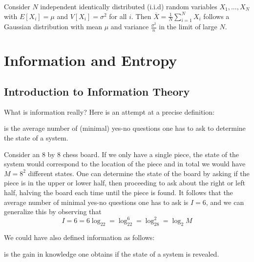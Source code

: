 \documentclass[12pt, a4paper, oneside, openright, titlepage]{book}
\begin{document}
\begin{namthm}
    Consider $N$ independent identically distributed (i.i.d) random variables $X_1,...,X_N$ with $E[X_i] = \mu$ and $V[X_i] = \sigma^2$ for all $i$. Then $\overline{X} = \frac{1}{N}\sum_{i=1}^NX_i$ follows a Gaussian distribution with mean $\mu$ and variance $\frac{\sigma^2}{n}$ in the limit of large $N$.
\end{namthm}







\chapter{Information and Entropy}


\section{Introduction to Information Theory}

What is information really? Here is an attempt at a precise definition:

\begin{defn}
     is the average number of (minimal) yes-no questions one has to ask to determine the state of a system.
\end{defn}

\begin{eg}
    Consider an $8$ by $8$ chess board. If we only have a single piece, the state of the system would correspond to the location of the piece and in total we would have $M = 8^2$ different states. One can determine the state of the board by asking if the piece is in the upper or lower half, then proceeding to ask about the right or left half, halving the board each time until the piece is found. It follows that the average number of minimal yes-no questions one has to ask is $I = 6$, and we can generalize this by observing that \begin{equation*}
        I = 6 = 6\log_22 = \log_22^6 = \log_28^2 = \log_2M
    \end{equation*}
\end{eg}

We could have also defined information as follows: 
\begin{defn}
     is the gain in knowledge one obtains if the state of a system is revealed.
\end{defn}
\end{document}
